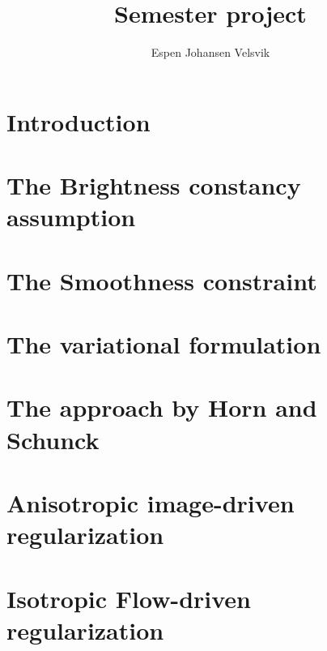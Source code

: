 \documentclass[10pt,a4paper]{article}
\begin{document}
\title{Semester project}
\author{Espen Johansen Velsvik}
\maketitle

\section{Introduction}


\section{The Brightness constancy assumption}


\section{The Smoothness constraint}


\section{The variational formulation}


\section{The approach by Horn and Schunck}



\section{Anisotropic image-driven regularization}


\section{Isotropic Flow-driven regularization}

  
\end{document}

